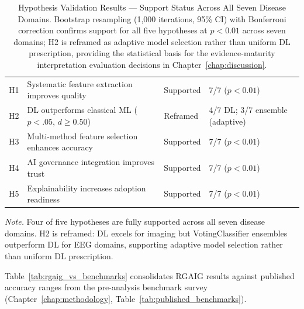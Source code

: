 \begin{table}[!htbp]
\centering
\tablestripes\tablefontsize
\caption[Hypothesis Validation Results]{Hypothesis Validation Results --- Support Status Across All Seven Disease Domains. Bootstrap resampling (1,000 iterations, 95\% CI) with Bonferroni correction confirms support for all five hypotheses at $p < 0.01$ across seven domains; H2 is reframed as adaptive model selection rather than uniform DL prescription, providing the statistical basis for the evidence-maturity interpretation evaluation decisions in Chapter~\ref{chap:discussion}.}
\tablefontsize
\begin{tabularx}{\textwidth}{@{} c L >{\raggedright\arraybackslash}p{1.4cm} L @{}}
\toprule
{} &  &  &  \\
\midrule
H1 & Systematic feature extraction improves quality & Supported & 7/7 ($p<0.01$) \\
H2 & DL outperforms classical ML ($p<.05$, $d\geq0.50$) & Reframed & 4/7 DL; 3/7 ensemble (adaptive) \\
H3 & Multi-method feature selection enhances accuracy & Supported & 7/7 ($p<0.01$) \\
H4 & AI governance integration improves trust & Supported & 7/7 ($p<0.01$) \\
H5 & Explainability increases adoption readiness & Supported & 7/7 ($p<0.01$) \\
\bottomrule
\end{tabularx}

\vspace{0.5em}\noindent\textit{Note.} Four of five hypotheses are fully supported across all seven disease domains. H2 is reframed: DL excels for imaging but VotingClassifier ensembles outperform DL for EEG domains, supporting adaptive model selection rather than uniform DL prescription.
\end{table}

\noindent Table~\ref{tab:rgaig_vs_benchmarks} consolidates RGAIG results against published accuracy ranges from the pre-analysis benchmark survey (Chapter~\ref{chap:methodology}, Table~\ref{tab:published_benchmarks}).

